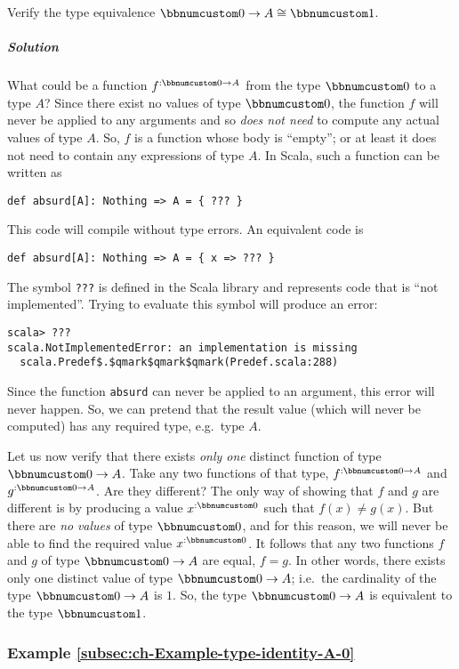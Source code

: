 Verify the type equivalence $\bbnum 0\rightarrow A\cong\bbnum 1$.

\subparagraph{Solution}

What could be a function $f^{:\bbnum 0\rightarrow A}$ from the type
$\bbnum 0$ to a type $A$? Since there exist no values of type $\bbnum 0$,
the function $f$ will never be applied to any arguments and so \emph{does
not need} to compute any actual values of type $A$. So, $f$ is a
function whose body is \textsf{``}empty\textsf{''}; or at least it does not need to
contain any expressions of type $A$. In Scala, such a function can
be written as
\begin{lstlisting}
def absurd[A]: Nothing => A = { ??? }
\end{lstlisting}
This code will compile without type errors. An equivalent code is
\begin{lstlisting}
def absurd[A]: Nothing => A = { x => ??? }
\end{lstlisting}
The symbol \lstinline!???! is defined in the Scala library and represents
code that is \textsf{``}not implemented\textsf{''}. Trying to evaluate this symbol
will produce an error:
\begin{lstlisting}
scala> ???
scala.NotImplementedError: an implementation is missing
  scala.Predef$.$qmark$qmark$qmark(Predef.scala:288) 
\end{lstlisting}
Since the function \lstinline!absurd! can never be applied to an
argument, this error will never happen. So, we can pretend that the
result value (which will never be computed) has any required type,
e.g.~type $A$.

Let us now verify that there exists \emph{only one} distinct function
of type $\bbnum 0\rightarrow A$. Take any two functions of that type,
$f^{:\bbnum 0\rightarrow A}$ and $g^{:\bbnum 0\rightarrow A}$. Are
they different? The only way of showing that $f$ and $g$ are different
is by producing a value $x^{:\bbnum 0}$ such that $f(x)\neq g(x)$.
But there are \emph{no} \emph{values} of type $\bbnum 0$, and for
this reason, we will never be able to find the required value $x^{:\bbnum 0}$.
It follows that any two functions $f$ and $g$ of type $\bbnum 0\rightarrow A$
are equal, $f=g$. In other words, there exists only one distinct
value of type $\bbnum 0\rightarrow A$; i.e.~the cardinality of the
type $\bbnum 0\rightarrow A$ is $1$. So, the type $\bbnum 0\rightarrow A$
is equivalent to the type $\bbnum 1$.

\subsubsection{Example \label{subsec:ch-Example-type-identity-A-0}\ref{subsec:ch-Example-type-identity-A-0}}

